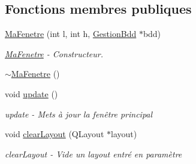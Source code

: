 \subsection*{Fonctions membres publiques}
\begin{DoxyCompactItemize}
\item 
\hyperlink{class_ma_fenetre_ae39212ca7a4d4b4c99a13b1d5eb063fa}{Ma\-Fenetre} (int l, int h, \hyperlink{class_gestion_bdd}{Gestion\-Bdd} $\ast$bdd)
\begin{DoxyCompactList}\small\item\em \hyperlink{class_ma_fenetre}{Ma\-Fenetre} -\/ Constructeur. \end{DoxyCompactList}\item 
\hyperlink{class_ma_fenetre_a2396ba2918e49df8d0c4a8c70f927151}{$\sim$\-Ma\-Fenetre} ()
\item 
void \hyperlink{class_ma_fenetre_a342da912af9b611d47229fd190d68522}{update} ()
\begin{DoxyCompactList}\small\item\em update -\/ Mets à jour la fenêtre principal \end{DoxyCompactList}\item 
void \hyperlink{class_ma_fenetre_a4bc520a56473760bb8433a1de67da378}{clear\-Layout} (Q\-Layout $\ast$layout)
\begin{DoxyCompactList}\small\item\em clear\-Layout -\/ Vide un layout entré en paramètre \end{DoxyCompactList}\end{DoxyCompactItemize}
